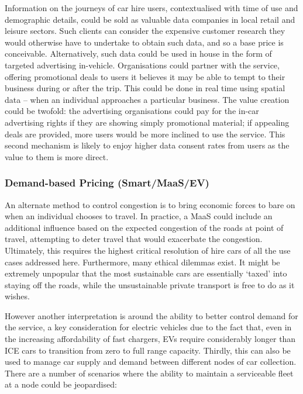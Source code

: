 \documentclass[journal]{IEEEtran}
\begin{document}
Information on the journeys of car hire users, contextualised with
time of use and demographic details, could be sold as valuable data
companies in local retail and leisure sectors. Such clients can
consider the expensive customer research they would otherwise have to
undertake to obtain such data, and so a base price is conceivable.
Alternatively, such data could be used in house in the form of
targeted advertising in-vehicle. Organisations could partner with the
service, offering promotional deals to users it believes it may be
able to tempt to their business during or after the trip. This could
be done in real time using spatial data – when an individual
approaches a particular business. The value creation could be twofold:
the advertising organisations could pay for the in-car advertising
rights if they are showing simply promotional material; if appealing
deals are provided, more users would be more inclined to use the
service. This second mechanism is likely to enjoy higher data consent
rates from users as the value to them is more direct.


\subsubsection{Demand-based Pricing (Smart/MaaS/EV)}

An alternate method to control congestion is to bring economic forces
to bare on when an individual chooses to travel. In practice, a MaaS
could include an additional influence based on the expected congestion
of the roads at point of travel, attempting to deter travel that would
exacerbate the congestion. Ultimately, this requires the highest
critical resolution of hire cars of all the use cases addressed
here. Furthermore, many ethical dilemmas exist. It might be extremely
unpopular that the most sustainable cars are essentially `taxed' into
staying off the roads, while the unsustainable private transport is
free to do as it wishes.

However another interpretation is around the ability to better control
demand for the service, a key consideration for electric vehicles due
to the fact that, even in the increasing affordability of fast
chargers, EVs require considerably longer than ICE cars to transition
from zero to full range capacity. Thirdly, this can also be used to
manage car supply and demand between different nodes of car
collection. There are a number of scenarios where the ability to
maintain a serviceable fleet at a node could be jeopardised:
\end{document}
